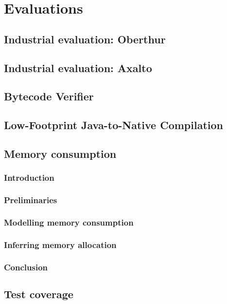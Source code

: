 \chapter{Evaluations}
\section{Industrial evaluation: Oberthur}
\section{Industrial evaluation: Axalto}
\section{Bytecode Verifier}
\section{Low-Footprint Java-to-Native Compilation}

\section{Memory consumption}
\subsection{Introduction}

\subsection{Preliminaries}\label{sec:prelim}

\subsection{Modelling memory consumption}\label{sec:verif}

\subsection{Inferring memory allocation}\label{sec:infer}

\subsection{Conclusion}\label{sec:conc}

\section{Test coverage}
